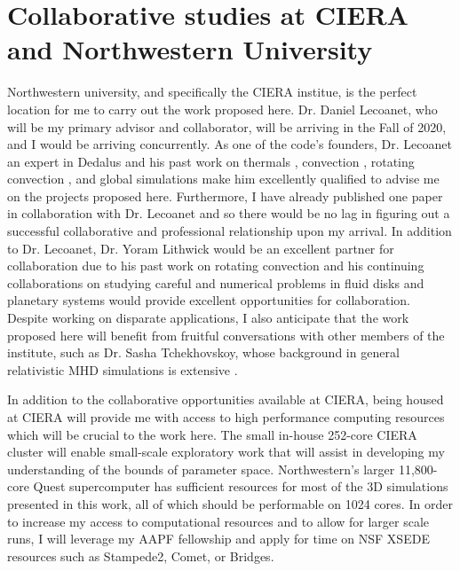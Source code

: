 \documentclass[aasms,12pt]{article}
\begin{document}
\section{Collaborative studies at CIERA and Northwestern University}
\label{sct:northwestern}
Northwestern university, and specifically the CIERA institue, is the perfect location for me to carry out the work proposed here.
Dr. Daniel Lecoanet, who will be my primary advisor and collaborator, will be arriving in the Fall of 2020, and I would be arriving concurrently.
As one of the code's founders, Dr. Lecoanet an expert in Dedalus and his past work on thermals \citep{lecoanet&jeevanjee2019, tarshis&all2018}, convection \citep{lecoanet&quataert2013, lecoanet&all2014, couston&all2017}, rotating convection \citep{couston&all2019}, and global simulations \citep{lecoanet&all2018} make him excellently qualified to advise me on the projects proposed here.
Furthermore, I have already published one paper in collaboration with Dr. Lecoanet and so there would be no lag in figuring out a successful collaborative and professional relationship upon my arrival.
In addition to Dr. Lecoanet, Dr. Yoram Lithwick would be an excellent partner for collaboration due to his past work on rotating convection \citep{BDLithwick2014} and his continuing collaborations on studying careful and numerical problems in fluid disks \citep{LDLithwick2019} and planetary systems \citep{hadden&lithwick2018} would provide excellent opportunities for collaboration.
Despite working on disparate applications, I also anticipate that the work proposed here will benefit from fruitful conversations with other members of the institute, such as Dr. Sasha Tchekhovskoy, whose background in general relativistic MHD simulations is extensive \citep[as in e.g.,][]{tchekhovskoy&bromberg2016}.

In addition to the collaborative opportunities available at CIERA, being housed at CIERA will provide me with access to high performance computing resources which will be crucial to the work here.
The small in-house 252-core CIERA cluster will enable small-scale exploratory work that will assist in developing my understanding of the bounds of parameter space.
Northwestern's larger 11,800-core Quest supercomputer has sufficient resources for most of the 3D simulations presented in this work, all of which should be performable on 1024 cores.
In order to increase my access to computational resources and to allow for larger scale runs, I will leverage my AAPF fellowship and apply for time on NSF XSEDE resources such as Stampede2, Comet, or Bridges.
\end{document}
